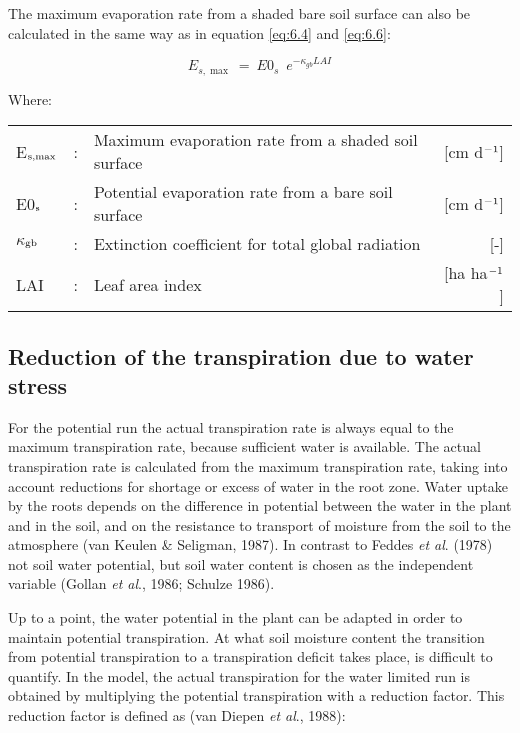 The maximum evaporation rate from a shaded bare soil surface can also be calculated in
the same way as in equation \ref{eq:6.4} and \ref{eq:6.6}:

\begin{equation}
\label{eq:6.7}
E_{s,\max } ~=~ E0 _{s} \,\,\, e ^{-\kappa  _{gb} LAI}
\end{equation}

Where:\\[5pt]
\begin{tabularx}{\textwidth}{llXr}
E$_{{\rm s,max}}$ &:& Maximum evaporation rate from a shaded 
    soil surface & [cm d$^{{\rm -1}}$]\\
E0$_{{\rm s}}$ &:& Potential evaporation rate from a bare soil 
    surface & [cm d$^{{\rm -1}}$]\\
$\kappa$$_{{\rm gb}}$ &:& Extinction coefficient for total global radiation & [-]\\
LAI &:& Leaf area index & [ha ha$^{{\rm -1}}$]\\
\end{tabularx}

\subsection{Reduction of the transpiration due to water stress}

For the potential run the actual transpiration rate is always equal to the maximum
transpiration rate, because sufficient water is available. The actual transpiration rate is
calculated from the maximum transpiration rate, taking into account reductions for
shortage or excess of water in the root zone. Water uptake by the roots depends on the
difference in potential between the water in the plant and in the soil, and on the resistance
to transport of moisture from the soil to the atmosphere (van Keulen \& Seligman, 1987).
In contrast to Feddes {\it et al}. (1978) not soil water potential, but soil water content is
chosen as the independent variable (Gollan {\it et al}., 1986; Schulze 1986).

Up to a point, the water potential in the plant can be adapted in order to maintain
potential transpiration. At what soil moisture content the transition from potential
transpiration to a transpiration deficit takes place, is difficult to quantify. In the model,
the actual transpiration for the water limited run is obtained by multiplying the potential
transpiration with a reduction factor. This reduction factor is defined as (van Diepen {\it et
al}., 1988):

